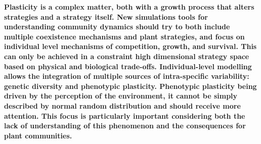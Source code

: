 {%
\textbf{Plasticity is a complex matter, both with a growth process that alters strategies and a strategy itself. New simulations tools for understanding community dynamics should try to both include multiple coexistence mechanisms and plant strategies, and focus on individual level mechanisms of competition, growth, and survival. This can only be achieved in a constraint high dimensional strategy space based on physical and biological trade-offs. Individual-level modelling allows the integration of multiple sources of intra-specific variability: genetic diversity and phenotypic plasticity. Phenotypic plasticity being driven by the perception of the environment, it cannot be simply described by normal random distribution and should receive more attention. This focus is particularly important considering both the lack of understanding of this phenomenon and the consequences for plant communities.  }



}
